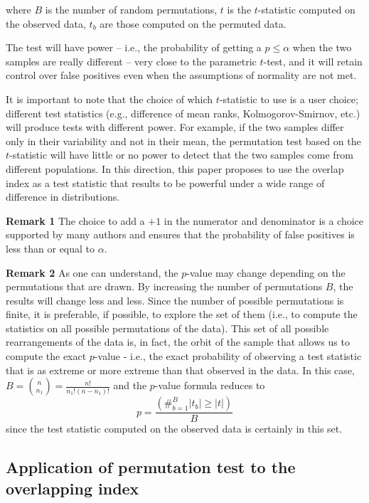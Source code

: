 \documentclass[twocolumn]{article}\usepackage[]{graphicx}\usepackage[]{xcolor}
\begin{document}
where $B$ is the number of random permutations, $t$ is the $t$-statistic computed on the observed data, $t_b$ are those computed on the permuted data.

The test will have power -- i.e., the probability of getting a $p\leq \alpha$ when the two samples are really different -- very close to the parametric $t$-test, and it will retain control over false positives even when the assumptions of normality are not met.

It is important to note that the choice of which $t$-statistic to use is a user choice; different test statistics (e.g., difference of mean ranks, Kolmogorov-Smirnov, etc.) will produce tests with different power. For example, if the two samples differ only in their variability and not in their mean, the permutation test based on the $t$-statistic will have little or no power to detect that the two samples come from different populations.
In this direction, this paper proposes to use the overlap index as a test statistic that results to be powerful under a wide range of difference in distributions.

{\bf Remark 1} The choice to add a $+1$ in the numerator and denominator is a choice supported by many authors \cite{phipson2010permutation,hemerik2018exact} and ensures that the probability of false positives is less than or equal to $\alpha$.

{\bf Remark 2} As one can understand, the $p$-value may change depending on the permutations that are drawn. By increasing the number of permutations $B$, the results will change less and less. Since the number of possible permutations is finite, it is preferable, if possible, to explore the set of them (i.e., to compute the statistics on all possible permutations of the data). This set of all possible rearrangements of the data is, in fact, the orbit of the sample that allows us to compute the exact $p$-value - i.e., the exact probability of observing a test statistic that is as extreme or more extreme than that observed in the data. In this case, $B=\binom{n}{n_1} = \frac{n!}{n_1!(n-n_1)!}$ and the $p$-value formula reduces to $$p=\frac{(\#_{b=1}^B |t_b|\geq |t|)}{B}$$ since the test statistic computed on the observed data is certainly in this set.


\subsection{Application of permutation test to the overlapping index}
\end{document}
